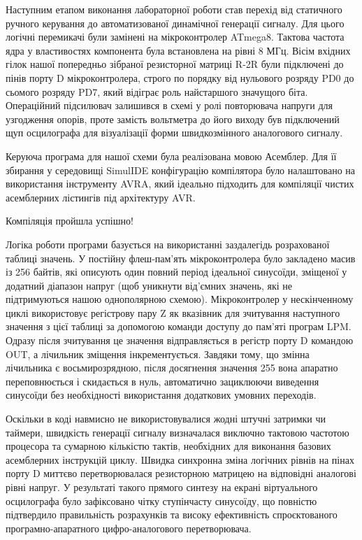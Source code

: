 \documentclass[14pt, a4paper]{extreport}
\begin{document}
	
	Наступним етапом виконання лабораторної роботи став перехід від статичного ручного керування до автоматизованої динамічної генерації сигналу. Для цього логічні перемикачі були замінені на мікроконтролер ATmega8. Тактова частота ядра у властивостях компонента була встановлена на рівні 8 МГц. Вісім вхідних гілок нашої попередньо зібраної резисторної матриці R-2R були підключені до пінів порту D мікроконтролера, строго по порядку від нульового розряду PD0 до сьомого розряду PD7, який відіграє роль найстаршого значущого біта. Операційний підсилювач залишився в схемі у ролі повторювача напруги для узгодження опорів, проте замість вольтметра до його виходу був підключений щуп осцилографа для візуалізації форми швидкозмінного аналогового сигналу.
	
	
	Керуюча програма для нашої схеми була реалізована мовою Асемблер. Для її збирання у середовищі SimulIDE конфігурацію компілятора було налаштовано на використання інструменту AVRA, який ідеально підходить для компіляції чистих асемблерних лістингів під архітектуру AVR.
	
	
	Компіляція пройшла успішно!
	
	
	Логіка роботи програми базується на використанні заздалегідь розрахованої таблиці значень. У постійну флеш-пам'ять мікроконтролера було закладено масив із 256 байтів, які описують один повний період ідеальної синусоїди, зміщеної у додатний діапазон напруг (щоб уникнути від'ємних значень, які не підтримуються нашою однополярною схемою). Мікроконтролер у нескінченному циклі використовує регістрову пару Z як вказівник для зчитування наступного значення з цієї таблиці за допомогою команди доступу до пам'яті програм LPM. Одразу після зчитування це значення відправляється в регістр порту D командою OUT, а лічильник зміщення інкрементується. Завдяки тому, що змінна лічильника є восьмирозрядною, після досягнення значення 255 вона апаратно переповнюється і скидається в нуль, автоматично зациклюючи виведення синусоїди без необхідності використання додаткових умовних переходів.
	
	Оскільки в коді навмисно не використовувалися жодні штучні затримки чи таймери, швидкість генерації сигналу визначалася виключно тактовою частотою процесора та сумарною кількістю тактів, необхідних для виконання базових асемблерних інструкцій циклу. Швидка синхронна зміна логічних рівнів на пінах порту D миттєво перетворювалася резисторною матрицею на відповідні аналогові рівні напруг. У результаті такого прямого синтезу на екрані віртуального осцилографа було зафіксовано чітку ступінчасту синусоїду, що повністю підтвердило правильність розрахунків та високу ефективність спроєктованого програмно-апаратного цифро-аналогового перетворювача.
	
\end{document}
